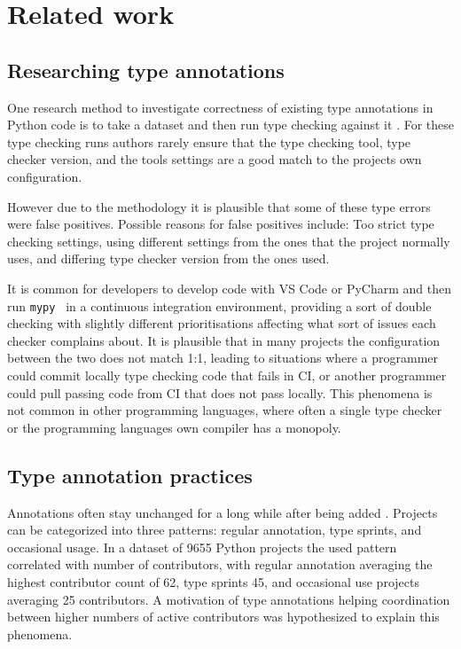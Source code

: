 \chapter{Related work\label{related_work}}

\section{Researching type annotations}

One research method to investigate correctness of existing type annotations in Python code is to take a dataset and then run type checking against it \cite{rak-amnouykit_taleoftwo_2020, di_grazia_evolution_2022}. For these type checking runs authors rarely ensure that the type checking tool, type checker version, and the tools settings are a good match to the projects own configuration.

However due to the methodology it is plausible that some of these type errors were false positives. Possible reasons for false positives include: Too strict type checking settings, using different settings from the ones that the project normally uses, and differing type checker version from the ones used.

It is common for developers to develop code with VS Code or PyCharm and then run {\tt mypy } in a continuous integration environment, providing a sort of double checking with slightly different prioritisations affecting what sort of issues each checker complains about. It is plausible that in many projects the configuration between the two does not match 1:1, leading to situations where a programmer could commit locally type checking code that fails in CI, or another programmer could pull passing code from CI that does not pass locally. This phenomena is not common in other programming languages, where often a single type checker or the programming languages own compiler has a monopoly. \citetemp


\section{Type annotation practices}

Annotations often stay unchanged for a long while after being added \cite{di_grazia_evolution_2022}. Projects can be categorized into three patterns: regular annotation, type sprints, and occasional usage. In a dataset of 9655 Python projects the used pattern correlated with number of contributors, with regular annotation averaging the highest contributor count of 62, type sprints 45, and occasional use projects averaging 25 contributors. A motivation of type annotations helping coordination between higher numbers of active contributors was hypothesized to explain this phenomena. 

